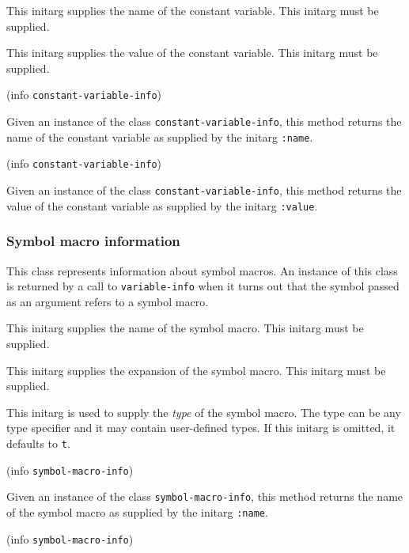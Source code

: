 
This initarg supplies the name of the constant variable.  This initarg
must be supplied. 


This initarg supplies the value of the constant variable.  This
initarg must be supplied.

 {(info {\tt constant-variable-info})}

Given an instance of the class \texttt{constant-variable-info}, this
method returns the name of the constant variable as supplied by the
initarg \texttt{:name}.

 {(info {\tt constant-variable-info})}

Given an instance of the class \texttt{constant-variable-info}, this
method returns the value of the constant variable as supplied by the
initarg \texttt{:value}.

\subsubsection{Symbol macro information}


This class represents information about symbol macros.  An
instance of this class is returned by a call to \texttt{variable-info}
when it turns out that the symbol passed as an argument refers to a
symbol macro.


This initarg supplies the name of the symbol macro.  This initarg must
be supplied.


This initarg supplies the expansion of the symbol macro.  This initarg
must be supplied.


This initarg is used to supply the \emph{type} of the symbol macro.
The type can be any type specifier and it may contain user-defined
types.  If this initarg is omitted, it defaults to \texttt{t}.

 {(info {\tt symbol-macro-info})}

Given an instance of the class \texttt{symbol-macro-info}, this method
returns the name of the symbol macro as supplied by the initarg
\texttt{:name}.

 {(info {\tt symbol-macro-info})}


